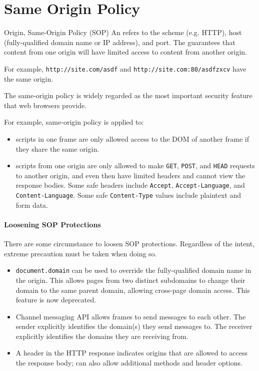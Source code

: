 \section{Same Origin Policy}

\begin{dfnbox}{Origin, Same-Origin Policy (SOP)}{}
    An  refers to the scheme (e.g. HTTP), host (fully-qualified domain name or IP address), and port. The  guarantees that content from one origin will have limited access to content from another origin.
\end{dfnbox}

For example, \texttt{http://site.com/asdf} and \texttt{http://site.com:80/asdfzxcv} have the same origin.

\begin{notebox}
 The same-origin policy is widely regarded as the most important security feature that web browsers provide.
\end{notebox}

For example, same-origin policy is applied to:
\begin{itemize}
    \item {} scripts in one frame are only allowed access to the DOM of another frame if they share the same origin.
    \item {} scripts from one origin are only allowed to make \texttt{GET}, \texttt{POST}, and \texttt{HEAD} requests to another origin, and even then have limited headers and cannot view the response bodies. Some safe headers include \texttt{Accept}, \texttt{Accept-Language}, and \texttt{Content-Language}. Some safe \texttt{Content-Type} values include plaintext and form data.
\end{itemize}

\paragraph{Loosening SOP Protections}
There are some circumstance to loosen SOP protections. Regardless of the intent, extreme precaution must be taken when doing so.
\begin{itemize}
    \item \texttt{document.domain} can be used to override the fully-qualified domain name in the origin. This allows pages from two distinct subdomains to change their domain to the same parent domain, allowing cross-page domain access. This feature is now deprecated.
    \item Channel messaging API allows frames to send messages to each other. The sender explicitly identifies the domain(s) they send messages to. The receiver explicitly identifies the domains they are receiving from.
    \item {} A header in the HTTP response indicates origins that are allowed to access the response body; can also allow additional methods and header options.
\end{itemize}

